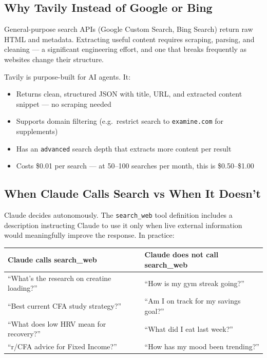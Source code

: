 \documentclass[12pt, a4paper]{article}
\begin{document}
\subsection{Why Tavily Instead of Google or Bing}

General-purpose search APIs (Google Custom Search, Bing Search) return raw HTML and metadata. Extracting useful content requires scraping, parsing, and cleaning --- a significant engineering effort, and one that breaks frequently as websites change their structure.

Tavily is purpose-built for AI agents. It:
\begin{itemize}[noitemsep]
    \item Returns clean, structured JSON with title, URL, and extracted content snippet --- no scraping needed
    \item Supports domain filtering (e.g.\ restrict search to \texttt{examine.com} for supplements)
    \item Has an \texttt{advanced} search depth that extracts more content per result
    \item Costs \$0.01 per search --- at 50--100 searches per month, this is \$0.50--\$1.00
\end{itemize}

\subsection{When Claude Calls Search vs When It Doesn't}

Claude decides autonomously. The \texttt{search\_web} tool definition includes a description instructing Claude to use it only when live external information would meaningfully improve the response. In practice:

\begin{longtable}{p{6cm} p{8cm}}
\toprule
\textbf{Claude calls search\_web} & \textbf{Claude does not call search\_web} \\
\midrule
``What's the research on creatine loading?'' & ``How is my gym streak going?'' \\
``Best current CFA study strategy?'' & ``Am I on track for my savings goal?'' \\
``What does low HRV mean for recovery?'' & ``What did I eat last week?'' \\
``r/CFA advice for Fixed Income?'' & ``How has my mood been trending?'' \\
\bottomrule
\end{longtable}
\end{document}
